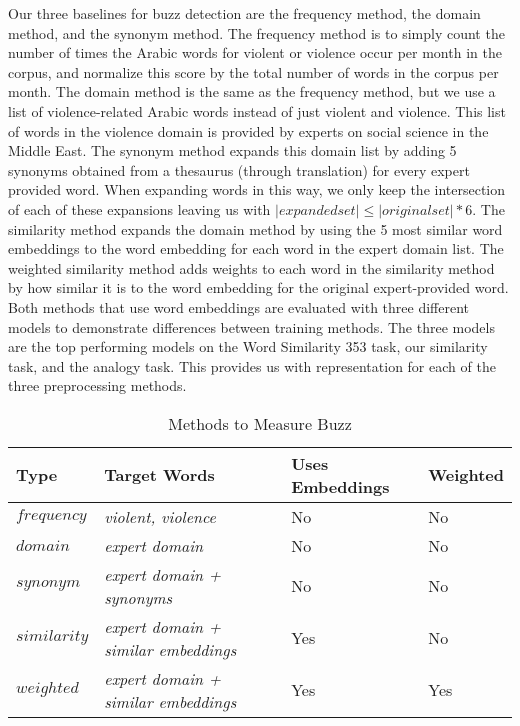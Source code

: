 Our three baselines for buzz detection are the frequency method, the domain method, and the synonym method. The frequency method is to simply count the number of times the Arabic words for violent or violence occur per month in the corpus, and normalize this score by the total number of words in the corpus per month. The domain method is the same as the frequency method, but we use a list of violence-related Arabic words instead of just violent and violence. This list of words in the violence domain is provided by experts on social science in the Middle East. The synonym method expands this domain list by adding 5 synonyms obtained from a thesaurus (through translation) for every expert provided word. When expanding words in this way, we only keep the intersection of each of these expansions leaving us with $|expanded set| \leq |original set| * 6$. The similarity method expands the domain method by using the 5 most similar word embeddings to the word embedding for each word in the expert domain list. The weighted similarity method adds weights to each word in the similarity method by how similar it is to the word embedding for the original expert-provided word. Both methods that use word embeddings are evaluated with three different models to demonstrate differences between training methods. The three models are the top performing models on the Word Similarity 353 task, our similarity task, and the analogy task. This provides us with representation for each of the three preprocessing methods.

\begin{table}
\begin{center}
\begin{tabular}{l|l|l|l}
\textbf{Type} & \textbf{Target Words} & \textbf{Uses Embeddings} & \textbf{Weighted} \\
\hline
$frequency$ & \textit{violent, violence} & No & No \\
$domain$ & \textit{expert domain} & No & No \\
$synonym$ & \textit{expert domain + synonyms} & No & No \\
$similarity$ & \textit{expert domain + similar embeddings} & Yes & No \\
$weighted$ & \textit{expert domain + similar embeddings} & Yes & Yes \\
\end{tabular}
\caption{Methods to Measure Buzz}
\label{table:buzztypes}
\end{center}
\end{table}


